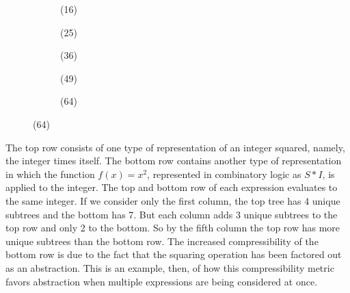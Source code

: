 \documentclass{article}
\begin{document}
\begin{figure}[h!]
  \vspace{2mm}
  \begin{subfigure}{.17\linewidth}
     \caption{(16)}
  \end{subfigure}
  \begin{subfigure}{.17\linewidth}
     \caption{(25)}
  \end{subfigure}
   \begin{subfigure}{.17\linewidth}
     \caption{(36)}
  \end{subfigure}
  \begin{subfigure}{.17\linewidth}
     \caption{(49)}
  \end{subfigure}
  \begin{subfigure}{.17\linewidth}
     \caption{(64)}
  \end{subfigure}
\end{figure}
\captionsetup[subfigure]{labelformat=parens} 

The top row consists of one type of representation of an integer
squared, namely, the integer times itself. The bottom row contains
another type of representation in which the function $f(x)=x^2$,
represented in combinatory logic as $S * I$, is applied to the
integer. The top and bottom row of each expression evaluates to the
same integer. If we consider only the first column, the top tree has 4
unique subtrees and the bottom has 7. But each column adds 3 unique
subtrees to the top row and only 2 to the bottom. So by the fifth
column the top row has more unique subtrees than the bottom row. The
increased compressibility of the bottom row is due to the fact that
the squaring operation has been factored out as an abstraction. This
is an example, then, of how this compressibility metric favors
abstraction when multiple expressions are being considered at once.
\end{document}
